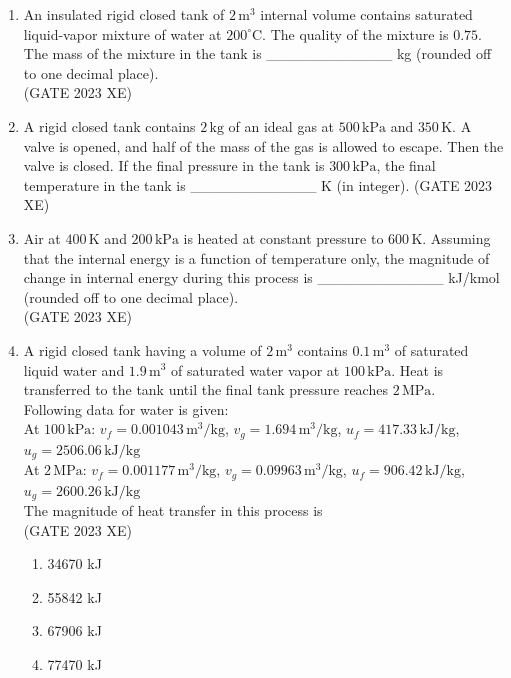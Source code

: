 \documentclass[journal,12pt,onecolumn]{IEEEtran}
\begin{document}
\begin{enumerate}
\newpage

\item An insulated rigid closed tank of $2\,\mathrm{m^3}$ internal volume contains saturated liquid-vapor mixture of water at $200^{\circ}\mathrm{C}$. The quality of the mixture is $0.75$. The mass of the mixture in the tank is \_\_\_\_\_\_\_\_\_\_\_\_ kg (rounded off to one decimal place). \\
\hfill{(GATE 2023 XE)}

\item A rigid closed tank contains $2\,\mathrm{kg}$ of an ideal gas at $500\,\mathrm{kPa}$ and $350\,\mathrm{K}$. A valve is opened, and half of the mass of the gas is allowed to escape. Then the valve is closed. If the final pressure in the tank is $300\,\mathrm{kPa}$, the final temperature in the tank is \_\_\_\_\_\_\_\_\_\_\_\_ K (in integer).
\hfill{(GATE 2023 XE)}

\item Air at $400\,\mathrm{K}$ and $200\,\mathrm{kPa}$ is heated at constant pressure to $600\,\mathrm{K}$. Assuming that the internal energy is a function of temperature only, the magnitude of change in internal energy during this process is \_\_\_\_\_\_\_\_\_\_\_\_ kJ/kmol (rounded off to one decimal place). \\
\hfill{(GATE 2023 XE)}

\item A rigid closed tank having a volume of $2\,\mathrm{m^3}$ contains $0.1\,\mathrm{m^3}$ of saturated liquid water and $1.9\,\mathrm{m^3}$ of saturated water vapor at $100\,\mathrm{kPa}$. Heat is transferred to the tank until the final tank pressure reaches $2\,\mathrm{MPa}$. \\
Following data for water is given: \\
At $100\,\mathrm{kPa}$: $v_f=0.001043\,\mathrm{m^3/kg}$, $v_g=1.694\,\mathrm{m^3/kg}$, $u_f=417.33\,\mathrm{kJ/kg}$, $u_g=2506.06\,\mathrm{kJ/kg}$ \\
At $2\,\mathrm{MPa}$: $v_f=0.001177\,\mathrm{m^3/kg}$, $v_g=0.09963\,\mathrm{m^3/kg}$, $u_f=906.42\,\mathrm{kJ/kg}$, $u_g=2600.26\,\mathrm{kJ/kg}$ \\
The magnitude of heat transfer in this process is\\
\hfill{(GATE 2023 XE)}

\begin{multicols}{2}
\begin{enumerate}
\item 34670 kJ
\item 55842 kJ
\item 67906 kJ
\item 77470 kJ
\end{enumerate}
\end{multicols}


\end{enumerate}
\end{document}
